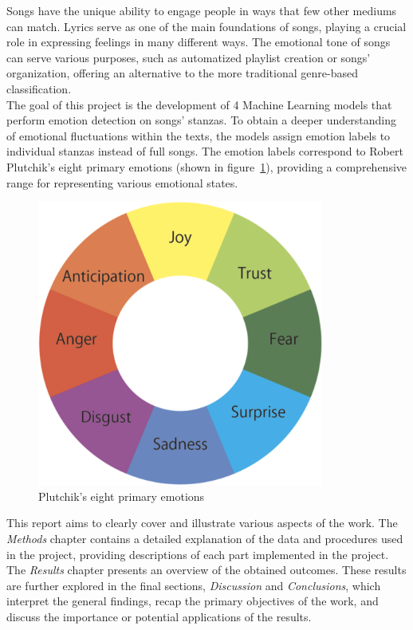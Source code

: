Songs have the unique ability to engage people in ways that few other mediums can match. 
Lyrics serve as one of the main foundations of songs, playing a crucial role in
expressing feelings in many different ways.
The emotional tone of songs can serve various purposes, such as
automatized playlist creation or songs' organization,
offering an alternative to the more traditional genre-based classification. \\
The goal of this project is the development of 4 Machine Learning models
that perform emotion detection on songs' stanzas. To obtain a deeper
understanding of emotional fluctuations within the texts, the models assign
emotion labels to individual stanzas instead of full songs.
The emotion labels correspond to Robert Plutchik's eight primary emotions
(shown in figure~\ref{fig:primary_emotions}), providing a comprehensive range
for representing various emotional states.\\
\begin{figure}[H]
    \centering
    \includegraphics[scale= 0.30]{pictures/plutchik_primary_emotions.png}
    \caption{Plutchik's eight primary emotions}
    \label{fig:primary_emotions}
\end{figure}

This report aims to clearly cover and illustrate various aspects of the work. 
The \textit{Methods} chapter contains a detailed explanation of the data and
procedures used in the project, providing descriptions of each part implemented
in the project.
The \textit{Results} chapter presents an overview of the
obtained outcomes.
These results are further explored in the final sections, \textit{Discussion}
and \textit{Conclusions}, which interpret the general findings, recap the
primary objectives of the work, and discuss the importance or potential
applications of the results.